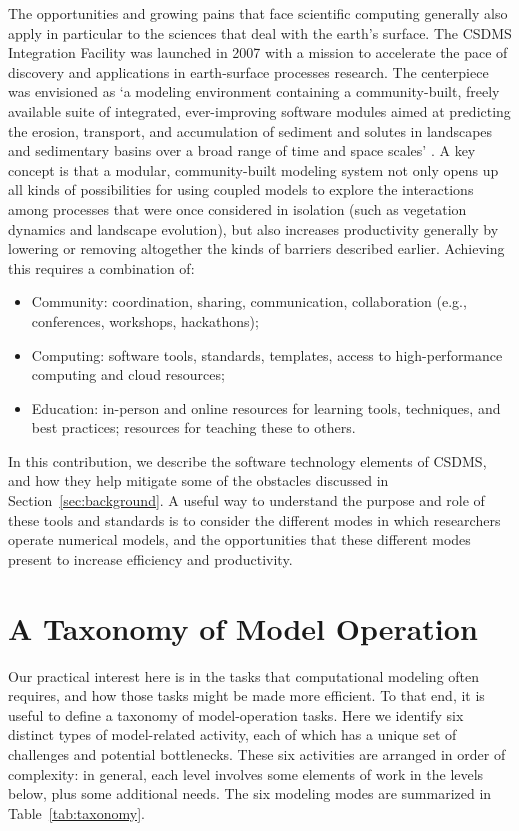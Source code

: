 \documentclass[12pt]{amsart}
\begin{document}
The opportunities and growing pains that face scientific computing generally also apply in particular to the sciences that deal with the earth's surface. The CSDMS Integration Facility was launched in 2007 with a mission to accelerate the pace of discovery and applications in earth-surface processes research. The centerpiece was envisioned as `a modeling environment containing a community-built, freely available suite of integrated, ever-improving software modules aimed at predicting the erosion, transport, and accumulation of sediment and solutes in landscapes and sedimentary basins over a broad range of time and space scales' \citep{anderson2004community}. A key concept is that a modular, community-built modeling system not only opens up all kinds of possibilities for using coupled models to explore the interactions among processes that were once considered in isolation (such as vegetation dynamics and landscape evolution), but also increases productivity generally by lowering or removing altogether the kinds of barriers described earlier. Achieving this requires a combination of:
\begin{itemize}
\item
Community: coordination, sharing, communication, collaboration (e.g., conferences, workshops, hackathons);
\item
Computing: software tools, standards, templates, access to high-performance computing and cloud resources;
\item
Education: in-person and online resources for learning tools, techniques, and best practices; resources for teaching these to others.
\end{itemize}
In this contribution, we describe the software technology elements of CSDMS, and how they help mitigate some of the obstacles discussed in Section~\ref{sec:background}. A useful way to understand the purpose and role of these tools and standards is to consider the different modes in which researchers operate numerical models, and the opportunities that these different modes present to increase efficiency and productivity.


\section{A Taxonomy of Model Operation}
\label{sec:taxonomy}

Our practical interest here is in the tasks that computational modeling often requires, and how those tasks might be made more efficient. To that end, it is useful to define a taxonomy of model-operation tasks. Here we identify six distinct types of model-related activity, each of which has a unique set of challenges and potential bottlenecks. These six activities are arranged in order of complexity: in general, each level involves some elements of work in the levels below, plus some additional needs. The six modeling modes are summarized in Table~\ref{tab:taxonomy}.
\end{document}
